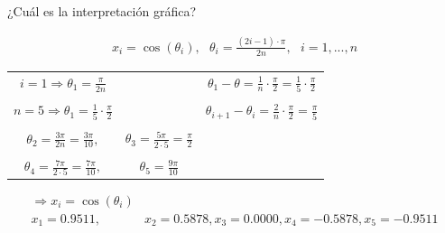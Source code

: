
\newpage


\begin{center} ¿Cuál es la interpretación gráfica?\\ \end{center}
\begin{align*}
x_{i} = \cos(\theta_{i}), \ \ \ \theta_{i} = \frac{(2i - 1)\cdot \pi}{2n}, \ \ \ i=1,...,n
\end{align*}
\begin{large}
\begin{tabular}{cc|c}
$i=1   \Rightarrow \theta_{1} = \frac{\pi}{2n}$ &\hspace{2cm} & $\theta_{1} - \theta = \frac{1}{n} \cdot \frac{\pi}{2} = \frac{1}{5} \cdot \frac{\pi}{2} $ \\
& &\\
$n = 5  \Rightarrow \theta_{1} = \frac{1}{5} \cdot \frac{\pi}{2}$& \hspace{2.5cm}& $\theta_{i+1} - \theta_{i} = \frac{2}{n} \cdot \frac{\pi}{2} = \frac{\pi}{5}$ \\
& & \\
$\theta_{2} = \frac{3 \pi}{2n} = \frac{3 \pi}{10},$ & $ \theta_{3} = \frac{5 \pi}{2 \cdot 5} = \frac{\pi}{2}$ & \\
& &\\
$\theta_{4} = \frac{7 \pi}{2 \cdot 5} = \frac{7 \pi}{10},$ & $ \theta_{5} = \frac{9 \pi}{10}$ &
\end{tabular}
\end{large}
\begin{align*}
\Rightarrow x_{i} = \cos( \theta_{i})& \\
x_{1}= 0.9511, & x_{2}= 0.5878, x_{3}= 0.0000, x_{4}= -0.5878, x_{5}= -0.9511\\
\end{align*}

